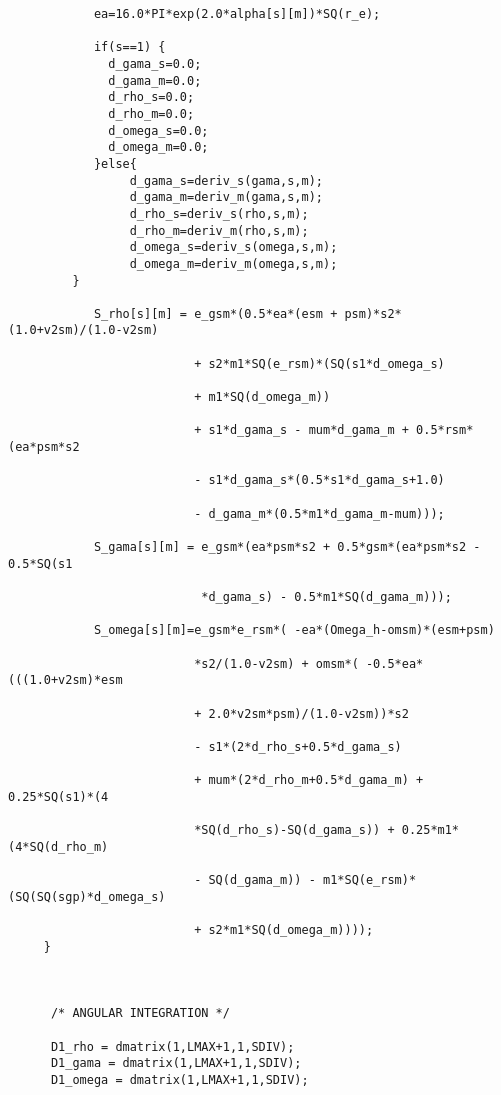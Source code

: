 \begin{verbatim}
            ea=16.0*PI*exp(2.0*alpha[s][m])*SQ(r_e);
 
            if(s==1) {
              d_gama_s=0.0;
              d_gama_m=0.0;
              d_rho_s=0.0;
              d_rho_m=0.0;
              d_omega_s=0.0;
              d_omega_m=0.0;
            }else{
                 d_gama_s=deriv_s(gama,s,m);
                 d_gama_m=deriv_m(gama,s,m);
                 d_rho_s=deriv_s(rho,s,m);
                 d_rho_m=deriv_m(rho,s,m);
                 d_omega_s=deriv_s(omega,s,m);
                 d_omega_m=deriv_m(omega,s,m);
	     }

            S_rho[s][m] = e_gsm*(0.5*ea*(esm + psm)*s2*(1.0+v2sm)/(1.0-v2sm)
  
                          + s2*m1*SQ(e_rsm)*(SQ(s1*d_omega_s) 
                       
                          + m1*SQ(d_omega_m))
                         
                          + s1*d_gama_s - mum*d_gama_m + 0.5*rsm*(ea*psm*s2  
 
                          - s1*d_gama_s*(0.5*s1*d_gama_s+1.0) 
 
                          - d_gama_m*(0.5*m1*d_gama_m-mum)));

            S_gama[s][m] = e_gsm*(ea*psm*s2 + 0.5*gsm*(ea*psm*s2 - 0.5*SQ(s1

                           *d_gama_s) - 0.5*m1*SQ(d_gama_m)));

            S_omega[s][m]=e_gsm*e_rsm*( -ea*(Omega_h-omsm)*(esm+psm)

                          *s2/(1.0-v2sm) + omsm*( -0.5*ea*(((1.0+v2sm)*esm 
                           
                          + 2.0*v2sm*psm)/(1.0-v2sm))*s2 

                          - s1*(2*d_rho_s+0.5*d_gama_s)

                          + mum*(2*d_rho_m+0.5*d_gama_m) + 0.25*SQ(s1)*(4

                          *SQ(d_rho_s)-SQ(d_gama_s)) + 0.25*m1*(4*SQ(d_rho_m)

                          - SQ(d_gama_m)) - m1*SQ(e_rsm)*(SQ(SQ(sgp)*d_omega_s)

                          + s2*m1*SQ(d_omega_m))));
	 }



      /* ANGULAR INTEGRATION */
   
      D1_rho = dmatrix(1,LMAX+1,1,SDIV);
      D1_gama = dmatrix(1,LMAX+1,1,SDIV);
      D1_omega = dmatrix(1,LMAX+1,1,SDIV);


\end{verbatim}
